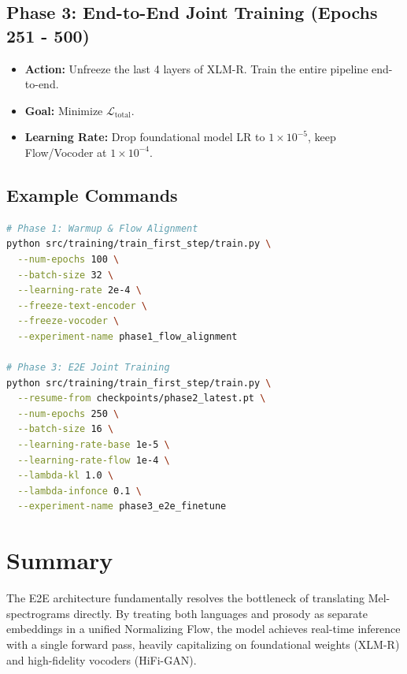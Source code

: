 \documentclass[11pt]{article}
\begin{document}
\subsection{Phase 3: End-to-End Joint Training (Epochs 251 - 500)}
\begin{itemize}[leftmargin=1.5em]
    \item \textbf{Action:} Unfreeze the last 4 layers of XLM-R. Train the entire pipeline end-to-end.
    \item \textbf{Goal:} Minimize $\mathcal{L}_{\text{total}}$.
    \item \textbf{Learning Rate:} Drop foundational model LR to $1 \times 10^{-5}$, keep Flow/Vocoder at $1 \times 10^{-4}$.
\end{itemize}

\subsection{Example Commands}

\begin{lstlisting}[language=bash]
# Phase 1: Warmup & Flow Alignment
python src/training/train_first_step/train.py \
  --num-epochs 100 \
  --batch-size 32 \
  --learning-rate 2e-4 \
  --freeze-text-encoder \
  --freeze-vocoder \
  --experiment-name phase1_flow_alignment

# Phase 3: E2E Joint Training
python src/training/train_first_step/train.py \
  --resume-from checkpoints/phase2_latest.pt \
  --num-epochs 250 \
  --batch-size 16 \
  --learning-rate-base 1e-5 \
  --learning-rate-flow 1e-4 \
  --lambda-kl 1.0 \
  --lambda-infonce 0.1 \
  --experiment-name phase3_e2e_finetune
\end{lstlisting}

\section{Summary}

The E2E architecture fundamentally resolves the bottleneck of translating Mel-spectrograms directly. By treating both languages and prosody as separate embeddings in a unified Normalizing Flow, the model achieves real-time inference with a single forward pass, heavily capitalizing on foundational weights (XLM-R) and high-fidelity vocoders (HiFi-GAN).
\end{document}
